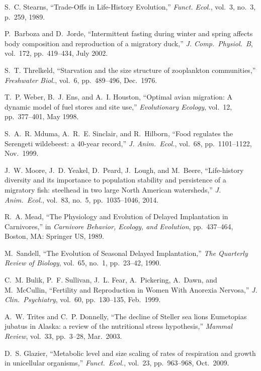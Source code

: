 \documentclass[twocolumn,preprintnumbers,amsmath,amssymb,superscriptaddress]{revtex4}
\begin{document}
{\begin{thebibliography}{10}
 S.~C. Stearns, ``{Trade-Offs in Life-History
    Evolution},'' {\em Funct. Ecol.}, vol.~3, no.~3, p.~259, 1989.

 P.~Barboza and D.~Jorde, ``{Intermittent fasting
    during winter and spring affects body composition and reproduction of a
    migratory duck},'' {\em J. Comp.\ Physiol.\ B}, vol.~172, pp.~419--434,
  July 2002.

 S.~T. Threlkeld, ``{Starvation and the size
    structure of zooplankton communities},'' {\em Freshwater Biol.}, vol.~6,
  pp.~489--496, Dec.\ 1976.

 T.~P. Weber, B.~J. Ens, and A.~I. Houston, ``{Optimal
    avian migration: A dynamic model of fuel stores and site use},'' {\em
    Evolutionary Ecology}, vol.~12, pp.~377--401, May 1998.

 S.~A.~R. Mduma, A.~R.~E. Sinclair, and R.~Hilborn,
  ``{Food regulates the Serengeti wildebeest: a 40-year record},'' {\em
    J. Anim.\ Ecol.}, vol.~68, pp.~1101--1122, Nov.\ 1999.

 J.~W. Moore, J.~D. Yeakel, D.~Peard, J.~Lough, and
  M.~Beere, ``{Life-history diversity and its importance to population
    stability and persistence of a migratory fish: steelhead in two large
    North American watersheds},'' {\em J.  Anim.\ Ecol.}, vol.~83, no.~5,
  pp.~1035--1046, 2014.

 R.~A. Mead, ``{The Physiology and Evolution of Delayed
    Implantation in Carnivores},'' in {\em Carnivore Behavior, Ecology, and
    Evolution}, pp.~437--464, Boston, MA: Springer US, 1989.

M.~Sandell, ``{The Evolution of Seasonal Delayed Implantation},'' {\em The
  Quarterly Review of Biology}, vol.~65, no.~1, pp.~23--42, 1990.

 C.~M. Bulik, P.~F. Sullivan, J.~L. Fear, A.~Pickering,
  A.~Dawn, and M.~McCullin, ``{Fertility and Reproduction in Women With
    Anorexia Nervosa},'' {\em J. Clin.\ Psychiatry}, vol.~60, pp.~130--135,
  Feb.\ 1999.

 A.~W. Trites and C.~P. Donnelly, ``{The decline of
    Steller sea lions Eumetopias jubatus in Alaska: a review of the
    nutritional stress hypothesis},'' {\em Mammal Review}, vol.~33,
  pp.~3--28, Mar.\ 2003.

 D.~S. Glazier, ``{Metabolic level and size scaling
    of rates of respiration and growth in unicellular organisms},'' {\em
    Funct.\ Ecol.}, vol.~23, pp.~963--968, Oct.\ 2009.


\end{thebibliography}}
\end{document}
